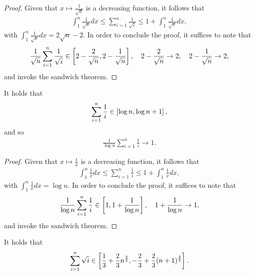 \begin{proof}
    Given that $x \mapsto \frac{1}{\sqrt{x}}$ is a decreasing function, it follows that
    \begin{align*}
        \int_1^n \frac{1}{\sqrt{x}}dx \leq \sum_{i = 1}^n \frac{1}{\sqrt{i}} \leq  1 + \int_1^n \frac{1}{\sqrt{x}}dx,
    \end{align*}
    with $\int_1^n \frac{1}{\sqrt{x}}dx = 2\sqrt{n} - 2$. In order to conclude the proof, it suffices to note that
    \begin{align*}
         \frac{1}{\sqrt{n}}\sum_{i = 1}^n \frac{1}{\sqrt{i}} \in \left[ 2 - \frac{2}{\sqrt{n}}, 2 - \frac{1}{\sqrt{n}}\right], \quad 2 - \frac{2}{\sqrt{n}} \to 2, \quad  2 - \frac{1}{\sqrt{n}} \to 2,
    \end{align*}
    and invoke the sandwich theorem.
\end{proof}




\begin{lemma} \label{lemma:series_one_over}
It holds that
\begin{align*}
    \sum_{i = 1}^n \frac{1}{i} \in \left[ \log{n}, \log{n}+1 \right],
\end{align*}
and so 
\begin{align*}
    \frac{1}{\log{n}}\sum_{i = 1}^n \frac{1}{i} \to 1.
\end{align*}
\end{lemma}

\begin{proof}
    Given that $x \mapsto \frac{1}{x}$ is a decreasing function, it follows that
    \begin{align*}
        \int_1^n \frac{1}{x}dx \leq \sum_{i = 1}^n \frac{1}{i} \leq  1 + \int_1^n \frac{1}{x}dx,
    \end{align*}
    with $\int_1^n \frac{1}{x}dx = \log n$. In order to conclude the proof, it suffices to note that
    \begin{align*}
         \frac{1}{\log{n}}\sum_{i = 1}^n \frac{1}{i} \in \left[ 1,  1 + \frac{1}{\log{n}}\right], \quad 1 + \frac{1}{\log{n}} \to 1,
    \end{align*}
    and invoke the sandwich theorem.
\end{proof}

\begin{lemma} \label{lemma:series_sqrt}
It holds that
\begin{align*}
    \sum_{i = 1}^n \sqrt i \in \left[ \frac{1}{3} + \frac{2}{3} 
 n^{\frac{3}{2}}, -\frac{2}{3} + \frac{2}{3} 
 (n+1)^{\frac{3}{2}} \right].
\end{align*}
\end{lemma}

